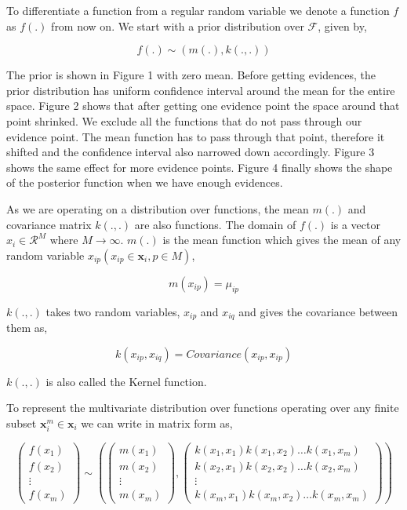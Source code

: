 \documentclass[english]{tktltiki}
\begin{document}
To differentiate a function from a regular random variable we denote a function $f$ as $f(.)$ from now on. We start with a prior distribution over $\mathcal{F}$, given by,

\begin{equation}
f(.) \sim (m(.), k(.,.))
\end{equation}

The prior is shown in Figure 1 with zero mean. Before getting evidences, the prior distribution has uniform confidence interval around the mean for the entire space. Figure 2 shows that after getting one evidence point the space around that point shrinked. We exclude all the functions that do not pass through our evidence point. The mean function has to pass through that point, therefore it shifted and the confidence interval also narrowed down accordingly. Figure 3 shows the same effect for more evidence points. Figure 4 finally shows the shape of the posterior function when we have enough evidences.

As we are operating on a distribution over functions, the mean $m(.)$ and covariance matrix $k(.,.)$ are also functions. The domain of $f(.)$ is a vector $x_i \in \mathcal{R}^M$ where $M \to \infty$. $m(.)$ is the mean function which gives the mean of any random variable $x_{ip} (x_{ip} \in \mathbf{x}_i, p \in M)$,

$$
m(x_{ip}) = \mu_{ip}
$$

$k(.,.)$ takes two random variables, $x_{ip}$ and $x_{iq}$ and gives the covariance between them as,

$$
k(x_{ip}, x_{iq}) = Covariance(x_{ip}, x_{ip})
$$

$k(.,.)$ is also called the Kernel function.

To represent the multivariate distribution over functions operating over any finite subset $\mathbf{x}_i^m \in \mathbf{x}_i$ we can write in matrix form as,

$$
\begin{pmatrix}
f(x_1) \\
f(x_2) \\
\vdots \\
f(x_m)
\end{pmatrix}
\sim\left(%
\begin{pmatrix}
m(x_1) \\
m(x_2) \\
\vdots \\
m(x_m)
\end{pmatrix}
,%
\begin{pmatrix}
k(x_1, x_1) k(x_1, x_2) \hdots k(x_1, x_m) \\
k(x_2, x_1) k(x_2, x_2) \hdots k(x_2, x_m) \\
\vdots \\
k(x_m, x_1) k(x_m, x_2) \hdots k(x_m, x_m) 
\end{pmatrix}\right)
$$
\end{document}
